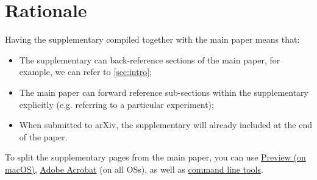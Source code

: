 \clearpage
\setcounter{page}{1}
\maketitlesupplementary


\section{Rationale}
\label{sec:rationale}
%
Having the supplementary compiled together with the main paper means that:
%
\begin{itemize}
\item The supplementary can back-reference sections of the main paper, for example, we can refer to \cref{sec:intro};
\item The main paper can forward reference sub-sections within the supplementary explicitly (e.g. referring to a particular experiment);
\item When submitted to arXiv, the supplementary will already included at the end of the paper.
\end{itemize}
%
To split the supplementary pages from the main paper, you can use \href{https://support.apple.com/en-ca/guide/preview/prvw11793/mac#:~:text=Delete%20a%20page%20from%20a,or%20choose%20Edit%20%3E%20Delete).}{Preview (on macOS)}, \href{https://www.adobe.com/acrobat/how-to/delete-pages-from-pdf.html#:~:text=Choose%20%E2%80%9CTools%E2%80%9D%20%3E%20%E2%80%9COrganize,or%20pages%20from%20the%20file.}{Adobe Acrobat} (on all OSs), as well as \href{https://superuser.com/questions/517986/is-it-possible-to-delete-some-pages-of-a-pdf-document}{command line tools}.